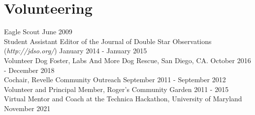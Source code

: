 \section{Volunteering}

Eagle Scout
    \hfill June 2009\\
Student Assistant Editor of the Journal of Double Star Observations ({\sl http://jdso.org/})
    \hfill January 2014 - January 2015\\
Volunteer Dog Foster, Labs And More Dog Rescue, San Diego, CA. 
    \hfill  October 2016 - December 2018\\
Cochair, Revelle Community Outreach 
    \hfill September 2011 - September 2012\\
Volunteer and Principal Member, Roger’s Community Garden 
    \hfill  2011 - 2015\\
Virtual Mentor and Coach at the Technica Hackathon, University of Maryland
    \hfill November 2021
